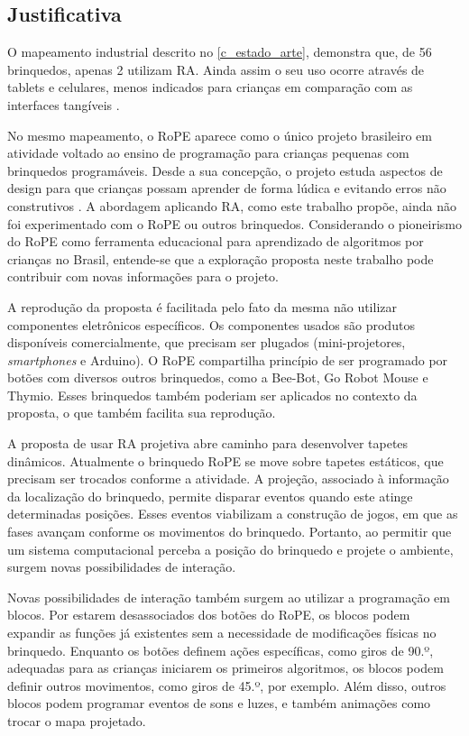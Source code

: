 \subsection{Justificativa}
\label{ss_cintro_justificativa}

O mapeamento industrial descrito no \autoref{c_estado_arte}, demonstra que, de 56 brinquedos, apenas 2 utilizam RA. Ainda assim o seu uso ocorre através de tablets e celulares, menos indicados para crianças em comparação com as interfaces tangíveis \cite{sapounidis_tangible_2019, zuckerman_tui_2013}.

No mesmo mapeamento, o RoPE aparece como o único projeto brasileiro em atividade voltado ao ensino de programação para crianças pequenas com brinquedos programáveis. Desde a sua concepção, o projeto estuda aspectos de design para que crianças possam aprender de forma lúdica e evitando erros não construtivos \cite{raabe_brinquedos_2015}. A abordagem aplicando \ac{RA}, como este trabalho propõe, ainda não foi experimentado com o RoPE ou outros brinquedos. Considerando o pioneirismo do RoPE como ferramenta educacional para aprendizado de algoritmos por crianças no Brasil, entende-se que a exploração proposta neste trabalho pode contribuir com novas informações para o projeto.

A reprodução da proposta é facilitada pelo fato da mesma não utilizar componentes eletrônicos específicos. Os componentes usados são produtos disponíveis comercialmente, que precisam ser plugados (mini-projetores, \textit{smartphones} e Arduino). O RoPE compartilha princípio de ser programado por botões com diversos outros brinquedos, como a Bee-Bot, Go Robot Mouse e Thymio. Esses brinquedos também poderiam ser aplicados no contexto da proposta, o que também facilita sua reprodução.

A proposta de usar \ac{RA} projetiva abre caminho para desenvolver tapetes dinâmicos. Atualmente o brinquedo RoPE se move sobre tapetes estáticos, que precisam ser trocados conforme a atividade. A projeção, associado à informação da localização do brinquedo, permite disparar eventos quando este atinge determinadas posições. Esses eventos viabilizam a construção de jogos, em que as fases avançam conforme os movimentos do brinquedo. Portanto, ao permitir que um sistema computacional perceba a posição do brinquedo e projete o ambiente, surgem novas possibilidades de interação.

Novas possibilidades de interação também surgem ao utilizar a programação em blocos. Por estarem desassociados dos botões do RoPE, os blocos podem expandir as funções já existentes sem a necessidade de modificações físicas no brinquedo. Enquanto os botões definem ações específicas, como giros de 90.º, adequadas para as crianças iniciarem os primeiros algoritmos, os blocos podem definir outros movimentos, como giros de 45.º, por exemplo. Além disso, outros blocos podem programar eventos de sons e luzes, e também animações como trocar o mapa projetado.

